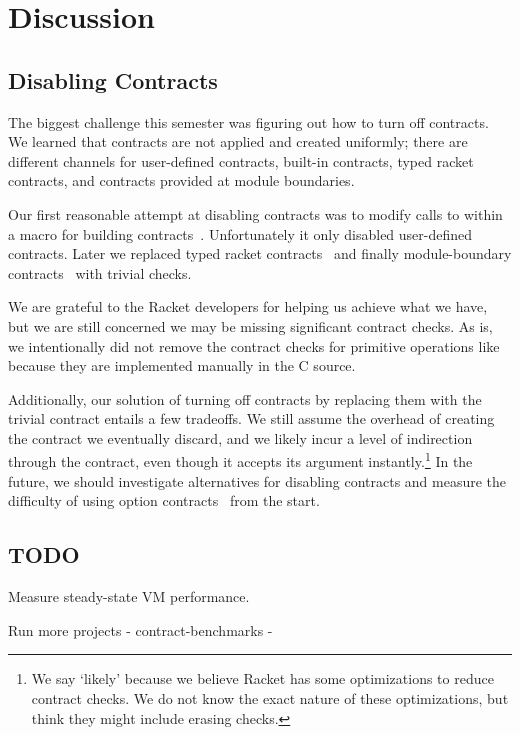 \newpage
\section{Discussion}
\label{discussion}

\subsection{Disabling Contracts}
\label{disabling-contracts}

The biggest challenge this semester was figuring out how to turn off contracts.
We learned that contracts are not applied and created uniformly; there are different channels for user-defined contracts, built-in contracts, typed racket contracts, and contracts provided at module boundaries.

Our first reasonable attempt at disabling contracts was to modify calls to  within a macro for building contracts~\cite{no-contracts1}.
Unfortunately it only disabled user-defined contracts.
Later we replaced typed racket contracts~\cite{no-contracts2} and finally module-boundary contracts~\cite{no-contracts3} with trivial checks.

We are grateful to the Racket developers for helping us achieve what we have, but we are still concerned we may be missing significant contract checks.
As is, we intentionally did not remove the contract checks for primitive operations like \mono{+} because they are implemented manually in the C source.

Additionally, our solution of turning off contracts by replacing them with the trivial  contract entails a few tradeoffs.
We still assume the overhead of creating the contract we eventually discard, and we likely incur a level of indirection through the  contract, even though it accepts its argument instantly.\footnote{We say `likely' because we believe Racket has some optimizations to reduce contract checks. We do not know the exact nature of these optimizations, but think they might include erasing  checks.}
In the future, we should investigate alternatives for disabling contracts and measure the difficulty of using option contracts~\cite{option-contracts} from the start.

\subsection{TODO}

Measure steady-state VM performance.

Run more projects
- contract-benchmarks
- 